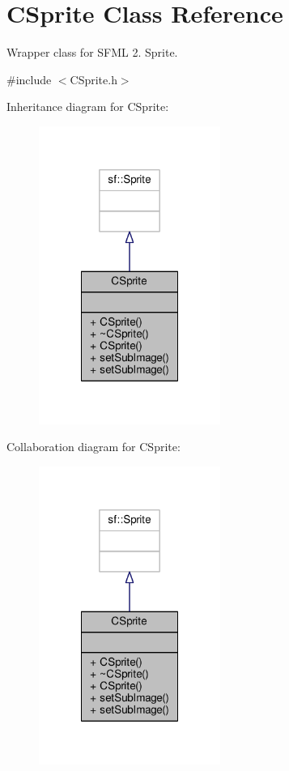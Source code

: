 \hypertarget{classCSprite}{\section{C\-Sprite Class Reference}
\label{classCSprite}
}


Wrapper class for S\-F\-M\-L 2. Sprite.  




{\ttfamily \#include $<$C\-Sprite.\-h$>$}



Inheritance diagram for C\-Sprite\-:\nopagebreak
\begin{figure}[H]
\begin{center}
\leavevmode
\includegraphics[width=168pt]{classCSprite__inherit__graph}
\end{center}
\end{figure}


Collaboration diagram for C\-Sprite\-:\nopagebreak
\begin{figure}[H]
\begin{center}
\leavevmode
\includegraphics[width=168pt]{classCSprite__coll__graph}
\end{center}
\end{figure}

